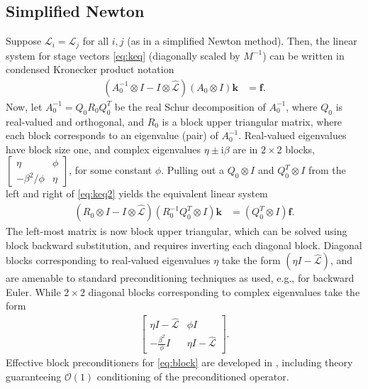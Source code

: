 \documentclass[review]{siamart}
\begin{document}
\subsection{Simplified Newton}\label{sec:nonlinear:simp}

Suppose $\mathcal{L}_i = \mathcal{L}_j$ for all $i,j$ (as in a simplified Newton method).
Then, the linear system for stage vectors \eqref{eq:keq} (diagonally scaled by $M^{-1}$)
can be written in condensed Kronecker product notation
%
\begin{align}\label{eq:keq2}
\left( A_0^{-1}\otimes I - I\otimes\widehat{\mathcal{L}}\right)
	(A_0\otimes I) \mathbf{k} & = \mathbf{f}.
\end{align}
%
Now, let $A_0^{-1} = Q_0R_0Q_0^T$ be the real Schur decomposition of $A_0^{-1}$, where
$Q_0$ is real-valued and orthogonal, and $R_0$ is a block
upper triangular matrix, where each block corresponds to an eigenvalue (pair) of
$A_0^{-1}$. Real-valued eigenvalues have block size one, and complex eigenvalues
$\eta\pm \mathrm{i} \beta$ are in $2\times 2$ blocks,
$\begin{bmatrix} \eta & \phi \\-\beta^2/\phi & \eta\end{bmatrix}$, for some
constant $\phi$.
Pulling out a $Q_0\otimes I$ and $Q_0^T\otimes I$ from the left and right of
\eqref{eq:keq2} yields the equivalent linear system
%
\begin{align}\label{eq:keq3}
\left( R_0\otimes I - I \otimes \widehat{\mathcal{L}}\right)
	(R_0^{-1}Q_0^T\otimes I) \mathbf{k} & = (Q_0^T\otimes I)\mathbf{f}.
\end{align}
%
The left-most matrix is now block upper triangular, which can be solved
using block backward substitution, and requires inverting each diagonal block.
Diagonal blocks corresponding to real-valued eigenvalues $\eta$ take the form
$(\eta I - \widehat{\mathcal{L}})$, and are amenable to standard preconditioning
techniques as used, e.g., for backward Euler. While $2\times 2$ diagonal blocks
corresponding to complex eigenvalues take the form
%
\begin{align}\label{eq:block}
\begin{bmatrix} \eta I - \widehat{\mathcal{L}} & \phi I\\
-\frac{\beta^2}{\phi} I & \eta I - \widehat{\mathcal{L}}\end{bmatrix}.
\end{align}
%
Effective block preconditioners for \eqref{eq:block} are developed in
, including theory guaranteeing $\mathcal{O}(1)$
conditioning of the preconditioned operator.
\end{document}
